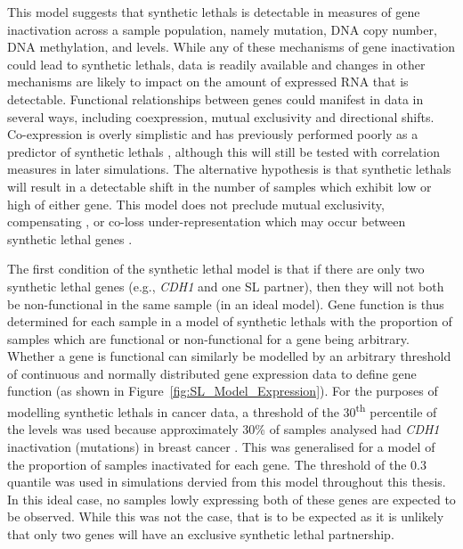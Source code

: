 This model suggests that \glspl{synthetic lethal} is detectable in measures of gene inactivation across a sample population, namely \gls{mutation}, \acrshort{DNA} copy number, \acrshort{DNA} \gls{methylation}, and  levels. While any of these mechanisms of gene inactivation could lead to \glspl{synthetic lethal},  data is readily available and changes in other mechanisms are likely to impact on the amount of expressed \acrshort{RNA} that is detectable. Functional relationships between genes could manifest in  data in several ways, including coexpression, mutual exclusivity and directional shifts. Co-expression is overly simplistic \citep{Lu2015} and has previously performed poorly as a predictor of \glspl{synthetic lethal} \citep{Jerby2014}, although this will still be tested with correlation measures in later simulations. The alternative hypothesis is that \glspl{synthetic lethal} will result in a detectable shift in the number of samples which exhibit low or high  of either gene. This model does not preclude mutual exclusivity, compensating , or co-loss under-representation which may occur between \gls{synthetic lethal} genes \citep{Wappett2016, Lu2015}. 

The first condition of the \gls{synthetic lethal} model is that if there are only two \gls{synthetic lethal} genes (e.g., \textit{CDH1} and one SL partner), then they will not both be non-functional in the same sample (in an ideal model). Gene function is thus determined for each sample in a model of \glspl{synthetic lethal} with the proportion of samples which are functional or non-functional for a gene being arbitrary. Whether a gene is functional can similarly be modelled by an arbitrary threshold of continuous and normally distributed \gls{gene expression} data to define gene function (as shown in Figure~\ref{fig:SL_Model_Expression}). For the purposes of modelling \glspl{synthetic lethal} in cancer  data, a threshold of the 30\textsuperscript{th} percentile of the  levels was used because approximately 30\% of samples analysed had \textit{CDH1} inactivation (mutations) in breast cancer \citep{TCGA2012}. This was generalised for a model of the proportion of samples inactivated for each gene. The threshold of the 0.3 quantile was used in simulations dervied from this model throughout this thesis. In this ideal case, no samples lowly expressing both of these genes are expected to be observed. While this was not the case, that is to be expected as it is unlikely that only two genes will have an exclusive \gls{synthetic lethal} partnership.

